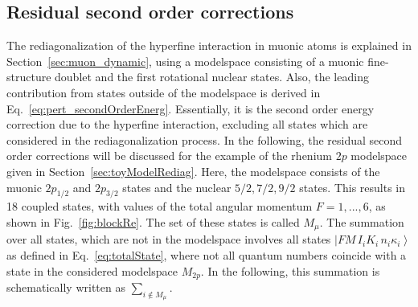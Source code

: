 \subsection{Residual second order corrections}
\label{sec:muon_residualSO}
The rediagonalization of the hyperfine interaction in muonic atoms is explained in Section~\ref{sec:muon_dynamic}, using a modelspace consisting of a muonic fine-structure doublet and the first rotational nuclear states. Also, the leading contribution from states outside of the modelspace is derived in Eq.~\eqref{eq:pert_secondOrderEnerg}. Essentially, it is the second order energy correction due to the hyperfine interaction, excluding all states which are considered in the rediagonalization process. In the following, the residual second order corrections will be discussed for the example of the rhenium $2p$ modelspace given in Section~\ref{sec:toyModelRediag}. Here, the modelspace consists of the muonic $2p_{1/2}$ and $2p_{3/2}$ states and the nuclear $5/2,7/2,9/2$ states. This results in 18 coupled states, with values of the total angular momentum $F=1,...,6$, as shown in Fig.~\ref{fig:blockRe}. The set of these states is called $M_{\mu}$. The summation over all states, which are not in the modelspace involves all states $\left|FM\,I_iK_i\,n_i\kappa_i\right>$ as defined in Eq.~\eqref{eq:totalState}, where not all quantum numbers coincide with a state in the considered modelspace $M_{2p}$. In the following, this summation is schematically written as $\sum_{i\notin M_{\mu}}$.

